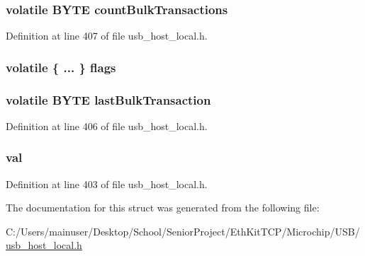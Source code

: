 \subsubsection[{count\+Bulk\+Transactions}]{\setlength{\rightskip}{0pt plus 5cm}volatile {\bf B\+Y\+T\+E} count\+Bulk\+Transactions}\label{struct___u_s_b___b_u_s___i_n_f_o_a8b0cd03c8c8abb35b455a92d0bedf1ae}


Definition at line 407 of file usb\+\_\+host\+\_\+local.\+h.

\hypertarget{struct___u_s_b___b_u_s___i_n_f_o_aa12cc3aeba275737fc7a365890815557}{}
\subsubsection[{flags}]{\setlength{\rightskip}{0pt plus 5cm}volatile \{ ... \}                     flags}\label{struct___u_s_b___b_u_s___i_n_f_o_aa12cc3aeba275737fc7a365890815557}
\hypertarget{struct___u_s_b___b_u_s___i_n_f_o_a17e3a601d3baee999eaac517dc3f985d}{}
\subsubsection[{last\+Bulk\+Transaction}]{\setlength{\rightskip}{0pt plus 5cm}volatile {\bf B\+Y\+T\+E} last\+Bulk\+Transaction}\label{struct___u_s_b___b_u_s___i_n_f_o_a17e3a601d3baee999eaac517dc3f985d}


Definition at line 406 of file usb\+\_\+host\+\_\+local.\+h.

\hypertarget{struct___u_s_b___b_u_s___i_n_f_o_a1ba23d624885cedce131033610c85094}{}
\subsubsection[{val}]{ val}\label{struct___u_s_b___b_u_s___i_n_f_o_a1ba23d624885cedce131033610c85094}


Definition at line 403 of file usb\+\_\+host\+\_\+local.\+h.



The documentation for this struct was generated from the following file\+:\begin{DoxyCompactItemize}
\item 
C\+:/\+Users/mainuser/\+Desktop/\+School/\+Senior\+Project/\+Eth\+Kit\+T\+C\+P/\+Microchip/\+U\+S\+B/\hyperlink{usb__host__local_8h}{usb\+\_\+host\+\_\+local.\+h}\end{DoxyCompactItemize}
